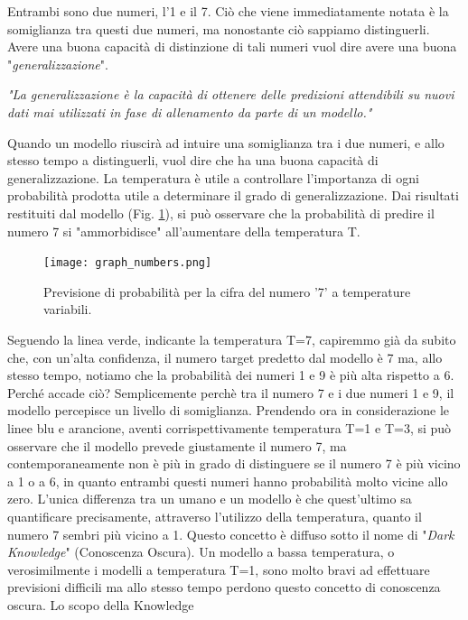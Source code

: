 Entrambi sono due numeri, l'1 
e il 7. Ciò che viene immediatamente notata è la somiglianza tra questi due 
numeri, ma nonostante ciò sappiamo distinguerli. Avere una buona capacità 
di distinzione di tali numeri vuol dire avere una buona "\emph{generalizzazione}". 
\begin{displayquote}
    \emph{"La generalizzazione è la capacità di ottenere delle predizioni 
    attendibili su nuovi dati mai utilizzati in fase di allenamento 
    da parte di un modello."}
\end{displayquote}
Quando un modello riuscirà ad intuire una somiglianza tra i due numeri, 
e allo stesso tempo a distinguerli, vuol dire che ha una buona capacità di 
generalizzazione. La temperatura è utile a controllare l'importanza di ogni 
probabilità prodotta utile a determinare il grado di generalizzazione. Dai 
risultati restituiti dal modello (Fig. \ref{7_1}), si può osservare che la probabilità 
di predire il numero 7 si "ammorbidisce" all'aumentare della temperatura T.
\begin{figure}
    \centering
    \texttt{[image: graph\_numbers.png]}
    \centering
    \caption{Previsione di probabilità per la cifra del numero '7' a temperature variabili.}
    \label{7_1}
\end{figure}
Seguendo la linea verde, indicante la temperatura T=7, capiremmo già da 
subito che, con un'alta confidenza, il numero target predetto dal modello è 7 
ma, allo stesso tempo, notiamo che la probabilità dei numeri 1 e 9 è più alta 
rispetto a 6. Perché accade ciò? Semplicemente perchè tra il numero 7 e i 
due numeri 1 e 9, il modello percepisce un livello di somiglianza. Prendendo 
ora in considerazione le linee blu e arancione, aventi corrispettivamente 
temperatura T=1 e T=3, si può osservare che il modello prevede giustamente 
il numero 7, ma contemporaneamente non è più in grado di distinguere se il 
numero 7 è più vicino a 1 o a 6, in quanto entrambi questi numeri hanno 
probabilità molto vicine allo zero. L'unica differenza tra un umano e un 
modello è che quest'ultimo sa quantificare precisamente, attraverso l'utilizzo 
della temperatura, quanto il numero 7 sembri più vicino a 1. Questo concetto 
è diffuso sotto il nome di "\emph{Dark Knowledge}" (Conoscenza Oscura). Un 
modello a bassa temperatura, o verosimilmente i modelli a temperatura 
T=1, sono molto bravi ad effettuare previsioni difficili ma allo stesso tempo 
perdono questo concetto di conoscenza oscura. Lo scopo della Knowledge 
